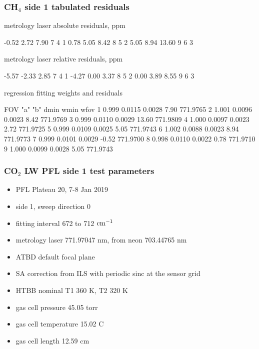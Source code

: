 \documentclass[10pt]{beamer}
\begin{document}
\begin{frame}[fragile]
\frametitle{CH$_4$ side 1 tabulated residuals}

  metrology laser absolute residuals, ppm
\begin{semiverbatim}\scriptsize
     -0.52     2.72     7.90         7   4   1
      0.78     5.05     8.42         8   5   2
      5.05     8.94    13.60         9   6   3
\end{semiverbatim}

  metrology laser relative residuals, ppm
\begin{semiverbatim}\scriptsize
     -5.57    -2.33     2.85         7   4   1
     -4.27     0.00     3.37         8   5   2
      0.00     3.89     8.55         9   6   3
\end{semiverbatim}

     regression fitting weights and residuals
\begin{semiverbatim}\scriptsize
 FOV   "a"       "b"     dmin     wmin      wfov
  1   0.999    0.0115   0.0028     7.90   771.9765 
  2   1.001    0.0096   0.0023     8.42   771.9769 
  3   0.999    0.0110   0.0029    13.60   771.9809 
  4   1.000    0.0097   0.0023     2.72   771.9725 
  5   0.999    0.0109   0.0025     5.05   771.9743 
  6   1.002    0.0088   0.0023     8.94   771.9773 
  7   0.999    0.0101   0.0029    -0.52   771.9700 
  8   0.998    0.0110   0.0022     0.78   771.9710 
  9   1.000    0.0099   0.0028     5.05   771.9743 
\end{semiverbatim}

\end{frame}
\begin{frame}
\frametitle{CO$_2$ LW PFL side 1 test parameters}

\begin{itemize}
  \item PFL Plateau 20, 7-8 Jan 2019
  \item side 1, sweep direction 0
  \item fitting interval 672 to 712 $\mbox{cm$^{-1}$}$
  \item metrology laser 771.97047 nm, from neon 703.44765 nm
  \item ATBD default focal plane
  \item SA correction from ILS with periodic sinc at the sensor grid
  \item HTBB nominal T1 360 K, T2 320 K
  \item gas cell pressure 45.05 torr
  \item gas cell temperature 15.02 C
  \item gas cell length 12.59 cm
\end{itemize}

\end{frame}
\end{document}
